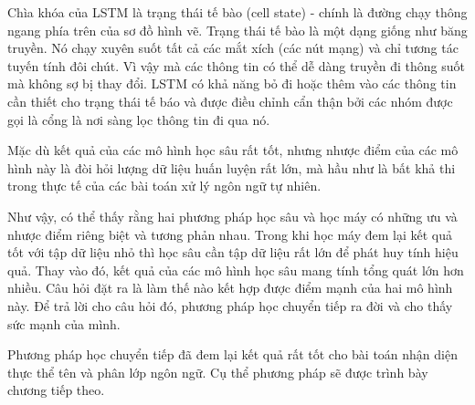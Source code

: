 \documentclass[14pt]{extreport}
\begin{document}
Chìa khóa của LSTM là trạng thái tế bào (cell state) - chính là đường chạy thông ngang phía trên của sơ đồ hình vẽ. Trạng thái tế bào là một dạng giống như băng truyền. Nó chạy xuyên suốt tất cả các mắt xích (các nút mạng) và chỉ tương tác tuyến tính đôi chút. Vì vậy mà các thông tin có thể dễ dàng truyền đi thông suốt mà không sợ bị thay đổi. LSTM có khả năng bỏ đi hoặc thêm vào các thông tin cần thiết cho trạng thái tế báo và được điều chỉnh cẩn thận bởi các nhóm được gọi là cổng là nơi sàng lọc thông tin đi qua nó.
    
Mặc dù kết quả của các mô hình học sâu rất tốt, nhưng nhược điểm của các mô hình này là đòi hỏi lượng dữ liệu huấn luyện rất lớn, mà hầu như là bất khả thi trong thực tế của các bài toán xử lý ngôn ngữ tự nhiên.


Như vậy, có thể thấy rằng hai phương pháp học sâu và học máy có những ưu và nhược điểm riêng biệt và tương phản nhau. Trong khi học máy đem lại kết quả tốt với tập dữ liệu nhỏ thì học sâu cần tập dữ liệu rất lớn để phát huy tính hiệu quả. Thay vào đó, kết quả của các mô hình học sâu mang tính tổng quát lớn hơn nhiều. Câu hỏi đặt ra là làm thế nào kết hợp được điểm mạnh của hai mô hình này. Để trả lời cho câu hỏi đó, phương pháp học chuyển tiếp ra đời và cho thấy sức mạnh của mình.

Phương pháp học chuyển tiếp đã đem lại kết quả rất tốt cho bài toán nhận diện thực thể tên và phân lớp ngôn ngữ. Cụ thể phương pháp sẽ được trình bày chương tiếp theo.
\end{document}
